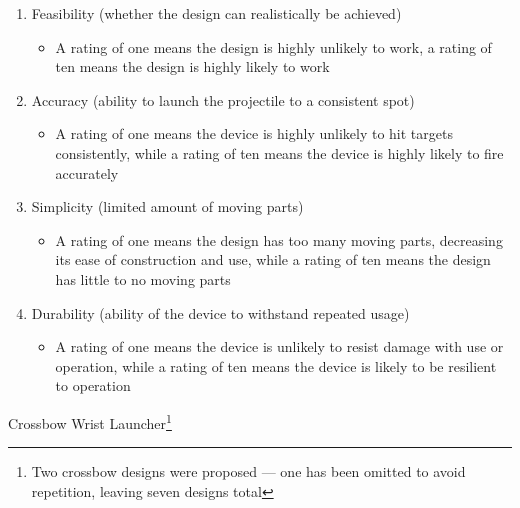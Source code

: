 \begin{enumerate}

  \item Feasibility (whether the design can realistically be achieved)

    \begin{itemize}

      \item A rating of one means the design is highly unlikely to work, a rating of ten means the design is highly likely to work

    \end{itemize}

  \item Accuracy (ability to launch the projectile to a consistent spot)

    \begin{itemize}

      \item A rating of one means the device is highly unlikely to hit targets consistently, while a rating of ten means the device is highly likely to fire accurately

    \end{itemize}

  \item Simplicity (limited amount of moving parts)

    \begin{itemize}

      \item A rating of one means the design has too many moving parts, decreasing its ease of construction and use, while a rating of ten means the design has little to no moving parts

    \end{itemize}

  \item Durability (ability of the device to withstand repeated usage)

    \begin{itemize}

      \item A rating of one means the device is unlikely to resist damage with use or operation, while a rating of ten means the device is likely to be resilient to operation

    \end{itemize}

\end{enumerate}

\begin{center}
  Crossbow Wrist Launcher\footnote{Two crossbow designs were proposed — one has been omitted to avoid repetition, leaving seven designs total}
\end{center}

